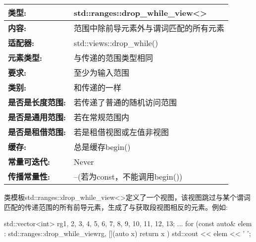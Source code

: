 
\begin{longtable}[c]{|l|l|}
\hline
\textbf{类型:}                 & std::ranges::drop\_while\_view\textless{}\textgreater{}        \\ \hline
\endfirsthead
%
\endhead
%
\textbf{内容:}              & 范围中除前导元素外与谓词匹配的所有元素 \\ \hline
\textbf{适配器:}              & std::views::drop\_while()                                      \\ \hline
\textbf{元素类型:}         & 与传递的范围类型相同                                      \\ \hline
\textbf{要求:}             & 至少为输入范围                                           \\ \hline
\textbf{类别:}             & 和传递的一样                                                 \\ \hline
\textbf{是否是长度范围:}       & 若传递了普通的随机访问范围                           \\ \hline
\textbf{是否是通用范围:}      & 若在常规范围内                                             \\ \hline
\textbf{是否是租借范围:}    & 若是租借视图或左值非视图                      \\ \hline
\textbf{缓存:}               & 总是缓存begin()                                          \\ \hline
\textbf{常量可迭代:}       & Never                                                          \\ \hline
\textbf{传播常量性:} & --(若为const，不能调用begin())                               \\ \hline
\end{longtable}

类模板std::ranges::drop\_while\_view<>定义了一个视图，该视图跳过与某个谓词匹配的传递范围的所有前导元素，生成了与获取段视图相反的元素。例如:

\begin{cpp}
std::vector<int> rg{1, 2, 3, 4, 5, 6, 7, 8, 9, 10, 11, 12, 13};
...
for (const auto& elem : std::ranges::drop_while_view{rg, [](auto x) {
						return x %
				}}) {
	std::cout << elem << ' ';
}
\end{cpp}

